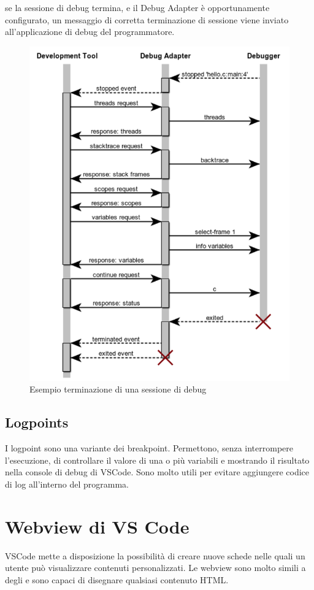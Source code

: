 se la sessione di debug termina, e il Debug Adapter è opportunamente configurato, un messaggio di corretta terminazione di sessione viene inviato all'applicazione di debug del programmatore.

\begin{figure}[H]    
    \centering
    \includegraphics[width=0.7\columnwidth]{images/stop-continue-terminate.png}
    \caption{Esempio terminazione di una sessione di debug\cite{DAP}}
\end{figure}

\subsection{Logpoints}
I logpoint sono una variante dei breakpoint. Permettono, senza interrompere l'esecuzione, di controllare il valore di una o più variabili e mostrando il risultato nella console di debug di VSCode. Sono molto utili per evitare aggiungere codice di log all'interno del programma.

\section{Webview di VS Code}

VSCode mette a disposizione la possibilità di creare nuove schede nelle quali un utente può visualizzare contenuti personalizzati. Le webview sono molto simili a degli  e sono capaci di disegnare qualsiasi contenuto HTML. 

